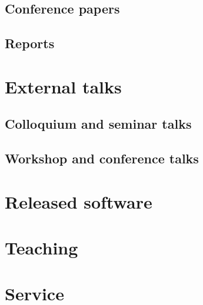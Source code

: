 \documentclass{article}
\begin{document}


\subsection*{Conference papers}



\subsection*{Reports}




\section*{External talks}

\subsection*{Colloquium and seminar talks}



\subsection*{Workshop and conference talks}




\section*{Released software}



\section*{Teaching}




\section*{Service}


\end{document}
